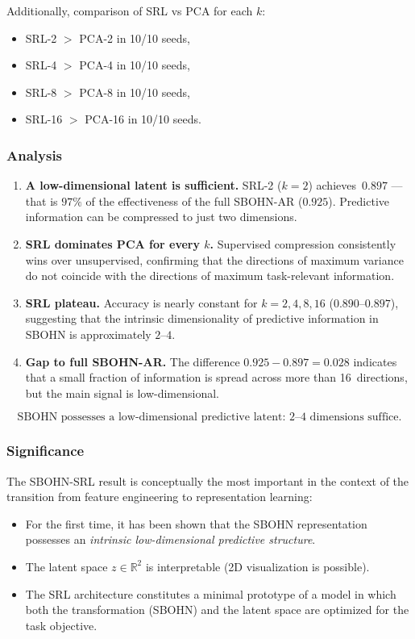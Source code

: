 \documentclass[11pt,a4paper]{report}
\begin{document}
Additionally, comparison of SRL vs PCA for each $k$:
\begin{itemize}
\item SRL-2 $>$ PCA-2 in 10/10 seeds,
\item SRL-4 $>$ PCA-4 in 10/10 seeds,
\item SRL-8 $>$ PCA-8 in 10/10 seeds,
\item SRL-16 $>$ PCA-16 in 10/10 seeds.
\end{itemize}

\subsubsection{Analysis}

\begin{enumerate}
\item \textbf{A low-dimensional latent is sufficient.} SRL-2 ($k=2$) achieves~$0.897$ --- that is $97\%$ of the effectiveness of the full SBOHN-AR ($0.925$). Predictive information can be compressed to just two dimensions.

\item \textbf{SRL dominates PCA for every $k$.} Supervised compression consistently wins over unsupervised, confirming that the directions of maximum variance do not coincide with the directions of maximum task-relevant information.

\item \textbf{SRL plateau.} Accuracy is nearly constant for $k=2,4,8,16$ ($0.890$--$0.897$), suggesting that the intrinsic dimensionality of predictive information in SBOHN is approximately $2$--$4$.

\item \textbf{Gap to full SBOHN-AR.} The difference $0.925 - 0.897 = 0.028$ indicates that a small fraction of information is spread across more than 16~directions, but the main signal is low-dimensional.
\end{enumerate}

\[
\boxed{\text{SBOHN possesses a low-dimensional predictive latent: 2--4 dimensions suffice.}}
\]

\subsubsection{Significance}

The SBOHN-SRL result is conceptually the most important in the context of the transition from feature engineering to representation learning:
\begin{itemize}
\item For the first time, it has been shown that the SBOHN representation possesses an \emph{intrinsic low-dimensional predictive structure}.
\item The latent space $z\in\mathbb{R}^2$ is interpretable (2D visualization is possible).
\item The SRL architecture constitutes a minimal prototype of a model in which both the transformation (SBOHN) and the latent space are optimized for the task objective.
\end{itemize}
\end{document}
